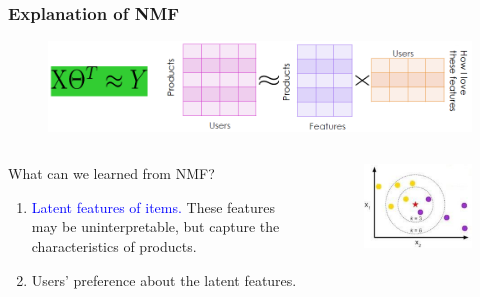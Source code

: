\documentclass{beamer}
\begin{document}
\begin{CJK*}{UTF8}{gbsn}
\begin{frame}\frametitle{Explanation of NMF}
\begin{figure}
\centering
\includegraphics[scale=0.4]{images/NMF1}
\end{figure}
\begin{columns}
\begin{column}{0.65\linewidth}
\begin{block}{What can we learned from NMF?}
\begin{enumerate}
\item \textcolor{blue}{Latent features of items.} These features may be uninterpretable, but capture the characteristics of products. 
\item Users' preference about the latent features.
\end{enumerate}
\end{block}
\end{column}
\begin{column}{0.35\linewidth}
\begin{figure}
\centering
\includegraphics[scale=0.4]{images/KNN}
\end{figure}
\end{column}
\end{columns}
\end{frame}




\end{CJK*}
\end{document}
